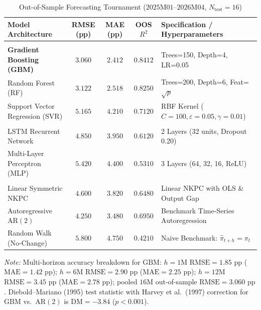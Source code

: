 \documentclass[review,12pt]{elsarticle}
\begin{document}
\begin{table}[htbp]
\centering
\small
\renewcommand{\arraystretch}{1.15}
\caption{Out-of-Sample Forecasting Tournament ($2025\text{M}01$--$2026\text{M}04$, $N_{\text{test}}=16$)}
\label{tab:ml_perf}
\begin{threeparttable}
\begin{tabularx}{\textwidth}{>{\raggedright\arraybackslash}p{3.6cm} ccc L}
\toprule
\textbf{Model Architecture} & \textbf{RMSE (pp)} & \textbf{MAE (pp)} & \textbf{OOS $R^2$} & \textbf{Specification / Hyperparameters} \\
\midrule
{} \\[2pt]
\textbf{Gradient Boosting (GBM)} & $\mathbf{3.060}$ & $\mathbf{2.412}$ & $\mathbf{0.8412}$ & Trees=150, Depth=4, LR=0.05 \\
Random Forest (RF) & $3.122$ & $2.518$ & $0.8250$ & Trees=200, Depth=6, Feat=$\sqrt{p}$ \\
Support Vector Regression (SVR) & $5.165$ & $4.210$ & $0.7120$ & RBF Kernel ($C=100, \varepsilon=0.05, \gamma=0.01$) \\[4pt]
 \\[2pt]
LSTM Recurrent Network & $4.850$ & $3.950$ & $0.6120$ & 2 Layers (32 units, Dropout 0.20) \\
Multi-Layer Perceptron (MLP) & $5.420$ & $4.400$ & $0.5310$ & 3 Layers (64, 32, 16, ReLU) \\[4pt]
 \\[2pt]
Linear Symmetric NKPC & $4.600$ & $3.820$ & $0.6480$ & Linear NKPC with OLS \& Output Gap \\
Autoregressive $\text{AR}(2)$ & $4.250$ & $3.480$ & $0.6950$ & Benchmark Time-Series Autoregression \\
Random Walk (No-Change) & $5.800$ & $4.750$ & $0.4210$ & Naive Benchmark: $\hat{\pi}_{t+h} = \pi_t$ \\
\bottomrule
\end{tabularx}
\begin{tablenotes}
\footnotesize
\item \textit{Note:} Multi-horizon accuracy breakdown for $\text{GBM}$: $h=1\text{M}$ $\text{RMSE}=1.85\text{ pp}$ ($\text{MAE}=1.42\text{ pp}$); $h=6\text{M}$ $\text{RMSE}=2.90\text{ pp}$ ($\text{MAE}=2.25\text{ pp}$); $h=12\text{M}$ $\text{RMSE}=3.45\text{ pp}$ ($\text{MAE}=2.78\text{ pp}$); pooled $16\text{M}$ out-of-sample $\text{RMSE}=3.060\text{ pp}$. Diebold--Mariano (1995) test statistic with Harvey et al.\ (1997) correction for $\text{GBM}$ vs.\ $\text{AR}(2)$ is $\text{DM} = -3.84$ ($p < 0.001$).
\end{tablenotes}
\end{threeparttable}
\end{table}
\end{document}
